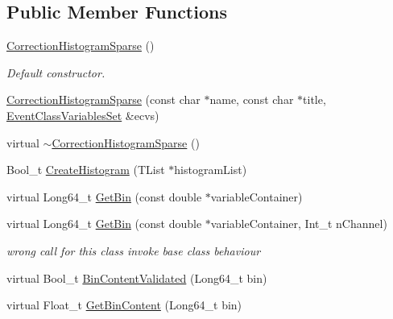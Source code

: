 \subsection*{Public Member Functions}
\begin{DoxyCompactItemize}
\item 
\mbox{\label{classQn_1_1CorrectionHistogramSparse_ac3030ab0d31967648b7d1ad11423c931}} 
\mbox{\hyperlink{classQn_1_1CorrectionHistogramSparse_ac3030ab0d31967648b7d1ad11423c931}{Correction\+Histogram\+Sparse}} ()
\begin{DoxyCompactList}\small\item\em Default constructor. \end{DoxyCompactList}\item 
\mbox{\hyperlink{classQn_1_1CorrectionHistogramSparse_a0399954f4572a32e62d70a7ea0fc7e17}{Correction\+Histogram\+Sparse}} (const char $\ast$name, const char $\ast$title, \mbox{\hyperlink{classQn_1_1EventClassVariablesSet}{Event\+Class\+Variables\+Set}} \&ecvs)
\item 
virtual \mbox{\hyperlink{classQn_1_1CorrectionHistogramSparse_aa8f2252efa1bdf5a4fd166aaf0f4c6ea}{$\sim$\+Correction\+Histogram\+Sparse}} ()
\item 
Bool\+\_\+t \mbox{\hyperlink{classQn_1_1CorrectionHistogramSparse_a53ee93b38933721305a26860324a03ea}{Create\+Histogram}} (T\+List $\ast$histogram\+List)
\item 
virtual Long64\+\_\+t \mbox{\hyperlink{classQn_1_1CorrectionHistogramSparse_aea9b7cdd8ad93d5fb14c00b20848dcdc}{Get\+Bin}} (const double $\ast$variable\+Container)
\item 
\mbox{\label{classQn_1_1CorrectionHistogramSparse_a1b0edb414fa4594421f44a793b0fc87a}} 
virtual Long64\+\_\+t \mbox{\hyperlink{classQn_1_1CorrectionHistogramSparse_a1b0edb414fa4594421f44a793b0fc87a}{Get\+Bin}} (const double $\ast$variable\+Container, Int\+\_\+t n\+Channel)
\begin{DoxyCompactList}\small\item\em wrong call for this class invoke base class behaviour \end{DoxyCompactList}\item 
virtual Bool\+\_\+t \mbox{\hyperlink{classQn_1_1CorrectionHistogramSparse_a0af98e0b06c550ed265494e1f3089779}{Bin\+Content\+Validated}} (Long64\+\_\+t bin)
\item 
virtual Float\+\_\+t \mbox{\hyperlink{classQn_1_1CorrectionHistogramSparse_a43954a12a3f97e20a1934f18ec4edecd}{Get\+Bin\+Content}} (Long64\+\_\+t bin)

\end{DoxyCompactItemize}
